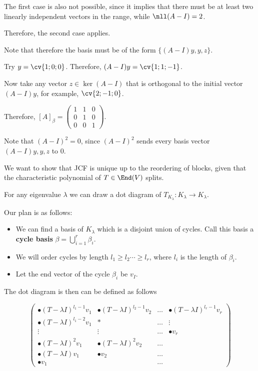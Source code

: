 \documentclass[11pt]{scrartcl}
\begin{document}
\begin{example}
  The first case is also not possible, since it implies that there
  must be at least two linearly independent vectors in the range,
  while $\nll (A-I) = 2$.
  
  Therefore, the second case applies.

  Note that therefore the basis must be of the form $\{(A-I)y, y, z\}$.

  Try $y = \cv{1;0;0}$. Therefore, $(A-I)y = \cv{1;1;-1}$.

  Now take any vector $z\in \ker (A-I)$ that is orthogonal to the
  initial vector $(A-I)y$, for example, $\cv{2;-1;0}$.

  Therefore, $[A]_{\beta} =
  \begin{pmatrix}
    1 & 1 & 0\\
    0 & 1 & 0\\
    0 & 0 & 1 
  \end{pmatrix}$.

  \begin{remark}
Note that $(A-I)^2 = 0$, since $(A-I)^2$ sends every basis vector $(A-I)y, y, z$ to $0$.
  \end{remark}
\end{example}

We want to show that JCF is unique up to the reordering of blocks, given that the characteristic polynomial of $T \in \End(V)$ splits.

For any eigenvalue $\lambda$ we can draw a dot diagram of $T_{K_{\lambda}}:K_{\lambda}\to K_{\lambda}$.

Our plan is as follows:

\begin{itemize}
\item We can find a basis of $K_{\lambda}$ which is a disjoint union of cycles. Call this basis a \textbf{cycle basis} $\beta= \bigcup_{i=1}^r\beta_i$.
\item We will order cycles by length $l_{1}\geq l_2 \cdots \geq l_r$, where $l_i$ is the length of $\beta_i$.
\item Let the end vector of the cycle $\beta_{i}$ be $v_I$.
\end{itemize}

The dot diagram is then can be defined as follows

\begin{equation*}
  \begin{pmatrix}
    \bullet (T-\lambda I)^{l_1-1}v_{1} & \bullet (T-\lambda I)^{l_2-1}v_2 & \dots & \bullet (T-\lambda I)^{l_r-1}v_{r}\\
    \bullet (T-\lambda I)^{l_1-2}v_{1} & * & \dots & \vdots\\
    \vdots & \vdots & \dots & \bullet v_r\\
    \bullet (T-\lambda I)^2v_{1} & \bullet (T-\lambda I)^2v_2 & \dots & \\
    \bullet (T-\lambda I)v_{1} & \bullet v_{2} & \dots & \\
    \bullet v_1 & &\dots & 
  \end{pmatrix}
\end{equation*}
\end{document}

